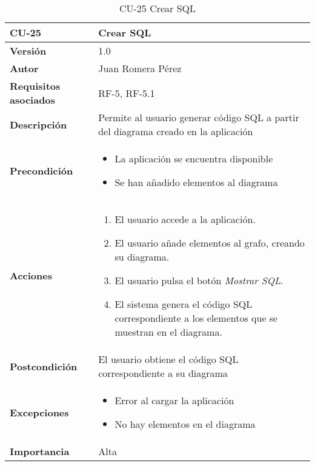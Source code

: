 \begin{table}[p]
    \centering
    \begin{tabularx}{\linewidth}{ p{} p{}}
		\toprule
		\textbf{CU-25}    & \textbf{Crear SQL}\\
		\toprule
		\textbf{Versión}              & 1.0    \\
		\textbf{Autor}                & Juan Romera Pérez \\
		\textbf{Requisitos asociados} & RF-5, RF-5.1 \\
		\textbf{Descripción}          & Permite al usuario generar código SQL a partir del diagrama creado en la aplicación \\
		\textbf{Precondición}         & \begin{itemize}
		    \item La aplicación se encuentra disponible
            \item Se han añadido elementos al diagrama
		\end{itemize} \\
		\textbf{Acciones}             &
		\begin{enumerate}
			\def\labelenumi{\arabic{enumi}.}
			\tightlist
			\item El usuario accede a la aplicación.
			\item El usuario añade elementos al grafo, creando su diagrama.
            \item El usuario pulsa el botón \emph{Mostrar SQL}.
            \item El sistema genera el código SQL correspondiente a los elementos que se muestran en el diagrama.
		\end{enumerate}\\
		\textbf{Postcondición}        & El usuario obtiene el código SQL correspondiente a su diagrama \\
		\textbf{Excepciones}          & \begin{itemize}
		    \item Error al cargar la aplicación
            \item No hay elementos en el diagrama
		\end{itemize} \\
		\textbf{Importancia}          & Alta \\
		\bottomrule
    \end{tabularx}
    \caption{CU-25 Crear SQL}
\end{table}

